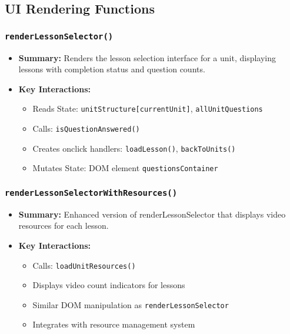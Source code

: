 \documentclass[11pt,letterpaper]{article}
\begin{document}
\subsection{UI Rendering Functions}

\subsubsection{\texttt{renderLessonSelector()}}
\begin{itemize}
    \item \textbf{Summary:} Renders the lesson selection interface for a unit, displaying lessons with completion status and question counts.
    \item \textbf{Key Interactions:}
    \begin{itemize}
        \item Reads State: \texttt{unitStructure[currentUnit]}, \texttt{allUnitQuestions}
        \item Calls: \texttt{isQuestionAnswered()}
        \item Creates onclick handlers: \texttt{loadLesson()}, \texttt{backToUnits()}
        \item Mutates State: DOM element \texttt{questionsContainer}
    \end{itemize}
\end{itemize}

\subsubsection{\texttt{renderLessonSelectorWithResources()}}
\begin{itemize}
    \item \textbf{Summary:} Enhanced version of renderLessonSelector that displays video resources for each lesson.
    \item \textbf{Key Interactions:}
    \begin{itemize}
        \item Calls: \texttt{loadUnitResources()}
        \item Displays video count indicators for lessons
        \item Similar DOM manipulation as \texttt{renderLessonSelector}
        \item Integrates with resource management system
    \end{itemize}
\end{itemize}
\end{document}
